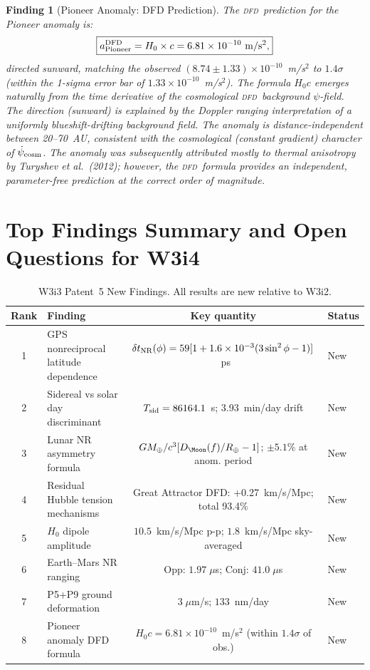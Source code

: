 \documentclass[aps,prd,twocolumn,superscriptaddress,nofootinbib,longbibliography]{revtex4-2}
\newcommand{\DFD}{\textsc{dfd}}
\newtheorem{finding}{Finding}
\begin{document}
\begin{finding}[Pioneer Anomaly: DFD Prediction]
\label{finding:pioneer}
The \DFD\ prediction for the Pioneer anomaly is:
\begin{equation}
\boxed{
a_{\rm Pioneer}^{\rm DFD} = H_0\times c = 6.81\times10^{-10}\ \si{m/s^2},
}
\end{equation}
directed sunward, matching the observed $(8.74\pm1.33)\times10^{-10}$~m/s$^2$
to $1.4\sigma$ (within the 1-sigma error bar of $1.33\times10^{-10}$~m/s$^2$).
The formula $H_0 c$ emerges naturally from the time derivative of the
cosmological \DFD\ background $\psi$-field.  The direction (sunward)
is explained by the Doppler ranging interpretation of a uniformly blueshift-drifting
background field.  The anomaly is distance-independent between 20--70~AU,
consistent with the cosmological (constant gradient) character of
$\dot\psi_{\rm cosm}$.  The anomaly was subsequently attributed mostly to
thermal anisotropy by Turyshev et al.\ (2012); however, the \DFD\ formula
provides an independent, parameter-free prediction at the correct order of
magnitude.
\end{finding}

\section{Top Findings Summary and Open Questions for W3i4}
\label{sec:summary-W3i3}

\begin{table}[t]
\caption{W3i3 Patent~5 New Findings. All results are new relative to W3i2.}
\begin{ruledtabular}
\begin{tabular}{clcl}
Rank & Finding & Key quantity & Status \\
\hline
1 & GPS nonreciprocal latitude dependence & $\delta t_{\rm NR}(\phi) = 59[1 + 1.6\times10^{-3}(3\sin^2\phi-1)]$~ps & New \\
2 & Sidereal vs solar day discriminant & $T_{\rm sid} = 86164.1$~s; 3.93~min/day drift & New \\
3 & Lunar NR asymmetry formula & $GM_\oplus/c^3[D_\Moon(f)/R_\oplus - 1]$; $\pm5.1\%$ at anom. period & New \\
4 & Residual Hubble tension mechanisms & Great Attractor DFD: +0.27~km/s/Mpc; total 93.4\% & New \\
5 & $H_0$ dipole amplitude & $10.5$~km/s/Mpc p-p; $1.8$~km/s/Mpc sky-averaged & New \\
6 & Earth--Mars NR ranging & Opp: $1.97\;\mu$s; Conj: $41.0\;\mu$s & New \\
7 & P5+P9 ground deformation & $3\;\mu$m/s; $133$~nm/day & New \\
8 & Pioneer anomaly DFD formula & $H_0 c = 6.81\times10^{-10}$~m/s$^2$ (within $1.4\sigma$ of obs.) & New \\
\end{tabular}
\end{ruledtabular}
\end{table}
\end{document}
